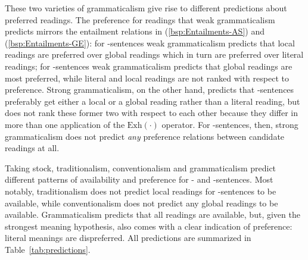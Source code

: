\documentclass[fleqn,reqno,10pt,draft]{article}
\newcommand{\as}{\acro{as}}
\renewcommand{\es}{\acro{es}}
\newcommand{\exh}{\ensuremath{\mathrm{Exh}}}
\begin{document}
These two varieties of grammaticalism give rise to different
predictions about preferred readings. The preference for readings that
weak grammaticalism predicts mirrors the entailment relations in
(\ref{bsp:Entailments-AS}) and (\ref{bsp:Entailments-GE}): for
\as-sentences weak grammaticalism predicts that local readings are
preferred over global readings which in turn are preferred over
literal readings; for \es-sentences weak grammaticalism predicts that
global readings are most preferred, while literal and local readings
are not ranked with respect to preference. Strong grammaticalism, on
the other hand, predicts that \as-sentences preferably get either a
local or a global reading rather than a literal reading, but does not
rank these former two with respect to each other because they differ
in more than one application of the $\exh(\cdot)$ operator. For
\es-sentences, then, strong grammaticalism does not predict \emph{any}
preference relations between candidate readings at all.

\medskip

Taking stock, traditionalism, conventionalism and grammaticalism
predict different patterns of availability and preference for \as- and
\es-sentences. Most notably, traditionalism does not predict local
readings for \es-sentences to be available, while conventionalism does
not predict any global readings to be available. Grammaticalism
predicts that all readings are available, but, given the strongest
meaning hypothesis, also comes with a clear indication of preference:
literal meanings are dispreferred. All predictions are summarized in
Table~\ref{tab:predictions}.
\end{document}
